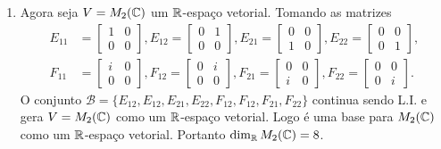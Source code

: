 \documentclass{beamer}
\begin{document}
\begin{frame}
    \begin{exemplos}
        \begin{enumerate}[label={\roman*})]
            \conti
            \item Agora seja $V = M_2(\mathbb{C})$ \pause um $\mathbb{R}$-espaço vetorial. \pause Tomando as matrizes\pause
            \begin{align*}
                E_{11} &= \begin{bmatrix}1 & 0\\0 & 0\end{bmatrix},
                E_{12} = \begin{bmatrix}0 & 1\\0 & 0\end{bmatrix},
                E_{21} = \begin{bmatrix}0 & 0\\1 & 0\end{bmatrix},
                E_{22} = \begin{bmatrix}0 & 0\\0 & 1\end{bmatrix},\\
                F_{11} &= \begin{bmatrix}i & 0\\0 & 0\end{bmatrix},
                F_{12} = \begin{bmatrix}0 & i\\0 & 0\end{bmatrix},
                F_{21} = \begin{bmatrix}0 & 0\\i & 0\end{bmatrix},
                F_{22} = \begin{bmatrix}0 & 0\\0 & i\end{bmatrix}.
            \end{align*}\pause
            O conjunto $\mathcal{B} = \{E_{12}, E_{12}, E_{21}, E_{22}, F_{12}, F_{12}, F_{21}, F_{22}\}$ \pause continua sendo L.I. \pause e gera $V = M_2(\mathbb{C})$ \pause como um $\mathbb{R}$-espaço vetorial. \pause Logo é uma base para $M_2(\mathbb{C})$ \pause como um $\mathbb{R}$-espaço vetorial. \pause Portanto $\dim_{\mathbb{R}} M_2(\mathbb{C}) = 8$.
            \seti
        \end{enumerate}
    \end{exemplos}
\end{frame}
\end{document}
